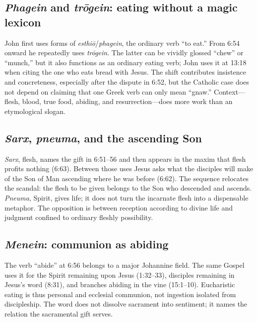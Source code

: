 \subsection{\emph{Phagein} and \emph{tr\=ogein}: eating without a magic lexicon}

John first uses forms of \emph{esthi\=o}/\emph{phagein}, the ordinary verb ``to
eat.'' From 6:54 onward he repeatedly uses \emph{tr\=ogein}. The latter can be
vividly glossed ``chew'' or ``munch,'' but it also functions as an ordinary
eating verb; John uses it at 13:18 when citing the one who eats bread with
Jesus. The shift contributes insistence and concreteness, especially after the
dispute in 6:52, but the Catholic case does not depend on claiming that one
Greek verb can only mean ``gnaw.'' Context---flesh, blood, true food, abiding,
and resurrection---does more work than an etymological slogan.

\subsection{\emph{Sarx}, \emph{pneuma}, and the ascending Son}

\emph{Sarx}, flesh, names the gift in 6:51--56 and then appears in the maxim
that flesh profits nothing (6:63). Between those uses Jesus asks what the
disciples will make of the Son of Man ascending where he was before (6:62).
The sequence relocates the scandal: the flesh to be given belongs to the Son
who descended and ascends. \emph{Pneuma}, Spirit, gives life; it does not turn
the incarnate flesh into a dispensable metaphor. The opposition is between
reception according to divine life and judgment confined to ordinary fleshly
possibility.

\subsection{\emph{Menein}: communion as abiding}

The verb ``abide'' at 6:56 belongs to a major Johannine field. The same Gospel
uses it for the Spirit remaining upon Jesus (1:32--33), disciples remaining in
Jesus's word (8:31), and branches abiding in the vine (15:1--10). Eucharistic
eating is thus personal and ecclesial communion, not ingestion isolated from
discipleship. The word does not dissolve sacrament into sentiment; it names the
relation the sacramental gift serves.

